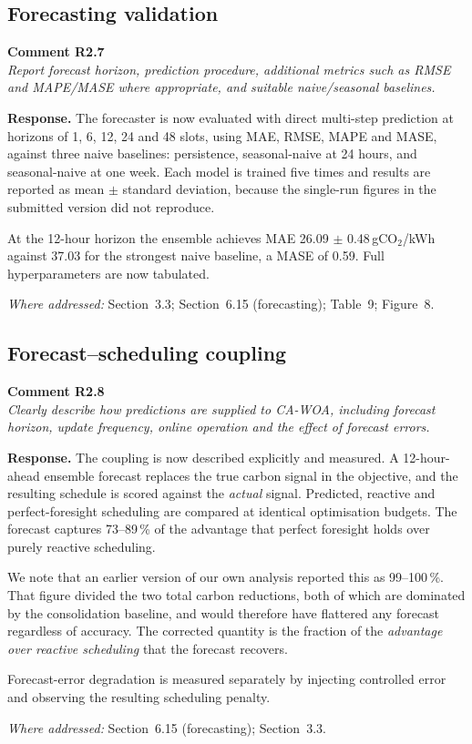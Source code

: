\documentclass[11pt,a4paper]{article}
\newcommand{\rsp}[1]{\vspace{2pt}\noindent\textbf{Response.} #1\par\vspace{6pt}}
\newcommand{\rwhere}[1]{\noindent\textit{Where addressed:} #1\par\vspace{10pt}}
\newenvironment{revcomment}[1]
  {\begin{tcolorbox}[colback=gray!6,colframe=gray!45,boxrule=0.4pt,
     left=6pt,right=6pt,top=4pt,bottom=4pt]\textbf{#1}\\[2pt]\itshape\color{cmt}}
  {\end{tcolorbox}\vspace{4pt}}
\begin{document}
\subsection*{Forecasting validation}
\begin{revcomment}{Comment R2.7}
Report forecast horizon, prediction procedure, additional metrics such as RMSE and
MAPE/MASE where appropriate, and suitable naive/seasonal baselines.
\end{revcomment}
\rsp{The forecaster is now evaluated with direct multi-step prediction at horizons of
1, 6, 12, 24 and 48 slots, using MAE, RMSE, MAPE and MASE, against three naive
baselines: persistence, seasonal-naive at 24 hours, and seasonal-naive at one week.
Each model is trained five times and results are reported as mean $\pm$ standard
deviation, because the single-run figures in the submitted version did not
reproduce.

At the 12-hour horizon the ensemble achieves MAE 26.09 $\pm$ 0.48\,gCO$_2$/kWh
against 37.03 for the strongest naive baseline, a MASE of 0.59. Full
hyperparameters are now tabulated.}
\rwhere{Section~3.3; Section~6.15 (forecasting); Table~9; Figure~8.}

\subsection*{Forecast--scheduling coupling}
\begin{revcomment}{Comment R2.8}
Clearly describe how predictions are supplied to CA-WOA, including forecast
horizon, update frequency, online operation and the effect of forecast errors.
\end{revcomment}
\rsp{The coupling is now described explicitly and measured. A 12-hour-ahead
ensemble forecast replaces the true carbon signal in the objective, and the
resulting schedule is scored against the \emph{actual} signal. Predicted,
reactive and perfect-foresight scheduling are compared at identical optimisation
budgets. The forecast captures 73--89\,\% of the advantage that perfect foresight
holds over purely reactive scheduling.

We note that an earlier version of our own analysis reported this as 99--100\,\%.
That figure divided the two total carbon reductions, both of which are dominated
by the consolidation baseline, and would therefore have flattered any forecast
regardless of accuracy. The corrected quantity is the fraction of the
\emph{advantage over reactive scheduling} that the forecast recovers.

Forecast-error degradation is measured separately by injecting controlled error and
observing the resulting scheduling penalty.}
\rwhere{Section~6.15 (forecasting); Section~3.3.}
\end{document}

